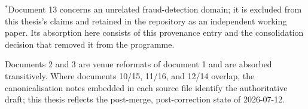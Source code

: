 \noindent$^\ast$Document 13 concerns an unrelated fraud-detection domain; it
is excluded from this thesis's claims and retained in the repository as an
independent working paper. Its absorption here consists of this provenance
entry and the consolidation decision that removed it from the programme.

Documents 2 and 3 are venue reformats of document 1 and are absorbed
transitively. Where documents 10/15, 11/16, and 12/14 overlap, the
canonicalisation notes embedded in each source file identify the
authoritative draft; this thesis reflects the post-merge, post-correction
state of 2026-07-12.
